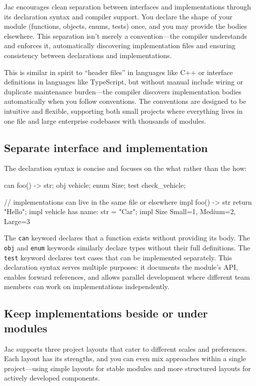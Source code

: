 Jac encourages clean separation between interfaces and implementations through its declaration syntax and compiler support. You declare the shape of your module (functions, objects, enums, tests) once, and you may provide the bodies elsewhere. This separation isn't merely a convention—the compiler understands and enforces it, automatically discovering implementation files and ensuring consistency between declarations and implementations.

This is similar in spirit to ``header files'' in languages like C++ or interface definitions in languages like TypeScript, but without manual include wiring or duplicate maintenance burden—the compiler discovers implementation bodies automatically when you follow conventions. The conventions are designed to be intuitive and flexible, supporting both small projects where everything lives in one file and large enterprise codebases with thousands of modules.

\subsection*{Separate interface and implementation}

The declaration syntax is concise and focuses on the what rather than the how:

\begin{jacblock}
can foo() -> str;
obj vehicle;
enum Size;
test check_vehicle;

// implementations can live in the same file or elsewhere
impl foo() -> str { return "Hello"; }
impl vehicle { has name: str = "Car"; }
impl Size { Small=1, Medium=2, Large=3 }
\end{jacblock}

The \texttt{can} keyword declares that a function exists without providing its body. The \texttt{obj} and \texttt{enum} keywords similarly declare types without their full definitions. The \texttt{test} keyword declares test cases that can be implemented separately. This declaration syntax serves multiple purposes: it documents the module's API, enables forward references, and allows parallel development where different team members can work on implementations independently.

\subsection*{Keep implementations beside or under modules}

Jac supports three project layouts that cater to different scales and preferences. Each layout has its strengths, and you can even mix approaches within a single project—using simple layouts for stable modules and more structured layouts for actively developed components.

